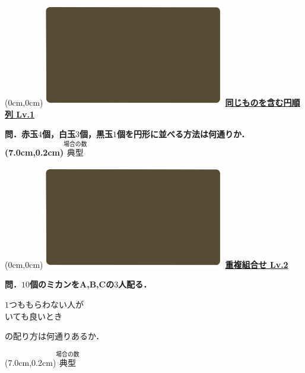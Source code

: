 \documentclass[10pt,
fleqn,
dvipdfmx,
uplatex
]{jsarticle}
\begin{document}
\newpage



\at(0cm,0cm){\includegraphics[width=8cm,bb=0 0 1920 1080]{./youtube/thumbnails/templates/smart_background/場合の数.jpeg}}
{\color{orange}\bf\boldmath\Large\underline{同じものを含む円順列 Lv.1 }}\vspace{0.3zw}

\huge 
\bf\boldmath 問．赤玉$4$個，白玉$3$個，黒玉$1$個を円形に並べる方法は何通りか．
\at(7.0cm,0.2cm){\small\color{bradorange}$\overset{\text{場合の数}}{\text{典型}}$}


\newpage



\at(0cm,0cm){\includegraphics[width=8cm,bb=0 0 1920 1080]{./youtube/thumbnails/templates/smart_background/場合の数.jpeg}}
{\color{orange}\bf\boldmath\LARGE\underline{重複組合せ Lv.2 }}\vspace{0.3zw}

\normalsize
\bf\boldmath 問．${10}$個のミカンをA,\;B,\;Cの$3$人配る．

\huge
\vspace{-0.1zw}
\hspace{0.1zw} $1$つももらわない人が\\
\hfill いても良いとき\hspace{0.1zw} 

\normalsize
\vspace{0.0zw}
\hfill の配り方は何通りあるか．

\at(7.0cm,0.2cm){\small\color{bradorange}$\overset{\text{場合の数}}{\text{典型}}$}


\newpage
\end{document}

